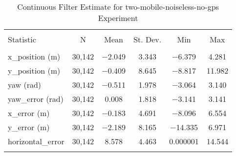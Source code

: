 
\begin{table}[h] \centering 
  \caption{Continuous Filter Estimate for two-mobile-noiseless-no-gps Experiment} 
  \label{tab:two_mobile_noiseless_no_gps_continuous_summary} 
\begin{tabular}{@{\extracolsep{5pt}}lccccc} 
\\[-1.8ex]\hline 
\hline \\[-1.8ex] 
Statistic & \multicolumn{1}{c}{N} & \multicolumn{1}{c}{Mean} & \multicolumn{1}{c}{St. Dev.} & \multicolumn{1}{c}{Min} & \multicolumn{1}{c}{Max} \\ 
\hline \\[-1.8ex] 
x\_position (m) & 30,142 & \num{-2.049} & \num{3.343} & \num{-6.379} & \num{4.281} \\ 
y\_position (m) & 30,142 & \num{-0.409} & \num{8.645} & \num{-8.817} & \num{11.982} \\ 
yaw (rad) & 30,142 & \num{-0.511} & \num{1.978} & \num{-3.064} & \num{3.140} \\ 
yaw\_error (rad) & 30,142 & \num{0.008} & \num{1.818} & \num{-3.141} & \num{3.141} \\ 
x\_error (m) & 30,142 & \num{-0.183} & \num{4.691} & \num{-8.096} & \num{6.554} \\ 
y\_error (m) & 30,142 & \num{-2.189} & \num{8.165} & \num{-14.335} & \num{6.971} \\ 
horizontal\_error & 30,142 & \num{8.578} & \num{4.463} & \num{0.000001} & \num{14.544} \\ 
\hline \\[-1.8ex] 
\end{tabular} 
\end{table} 
